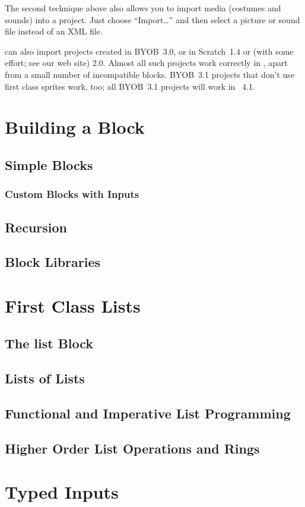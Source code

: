 \documentclass{report}
\begin{document}
The second technique above also allows you to import media (costumes and sounds) into a project. Just choose ``Import\ldots'' and then select a picture or sound file instead of an XML file.

\Snap{} can also import projects created in BYOB~3.0, or in Scratch~1.4 or (with some effort; see our web site) 2.0. Almost all such projects work correctly in \Snap{}, apart from a small number of incompatible blocks. BYOB~3.1 projects that don't use first class sprites work, too; all BYOB~3.1 projects will work in \Snap{}~4.1.

\chapter{Building a Block}
\section{Simple Blocks}
\subsection{Custom Blocks with Inputs}
\section{Recursion}
\section{Block Libraries}
\chapter{First Class Lists}
\section{The list Block}
\section{Lists of Lists}
\section{Functional and Imperative List Programming}
\section{Higher Order List Operations and Rings}
\chapter{Typed Inputs}
\end{document}
